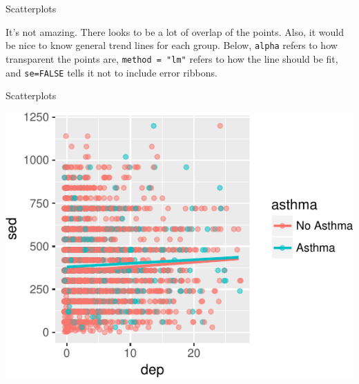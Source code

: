 \begin{frame}[fragile]{Scatterplots}

It's not amazing. There looks to be a lot of overlap of the points.
Also, it would be nice to know general trend lines for each group.
Below, \texttt{alpha} refers to how transparent the points are,
\texttt{method\ =\ "lm"} refers to how the line should be fit, and
\texttt{se=FALSE} tells it not to include error ribbons.

\begin{Shaded}
\begin{Highlighting}[]
\NormalTok{(}\OperatorTok{+}
\StringTok{  }\NormalTok{(}\NormalTok{(}\NormalTok{) }\OperatorTok{+}
\StringTok{  }\NormalTok{(}\NormalTok{(}
               \NormalTok{, }\NormalTok{)}
\end{Highlighting}
\end{Shaded}

\end{frame}

\begin{frame}{Scatterplots}

\includegraphics{09_AdvancedPlotting_files/figure-beamer/c3-1.pdf}

\end{frame}

